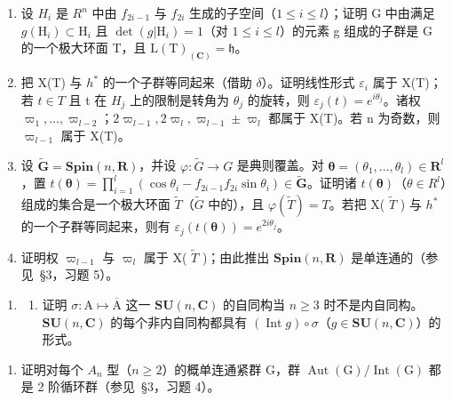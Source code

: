 \begin{enumerate}
\def\labelenumi{\alph{enumi})}
\tightlist
\item
  设 \(H_{i}\) 是 \(R^{n}\) 中由 \(f_{2i-1}\) 与 \(f_{2i}\) 生成的子空间（\(1 \leq i \leq l\)）；证明 G 中由满足 \(g(\mathrm{H}_{i}) \subset \mathrm{H}_{i}\) 且 \(\det(g|\mathrm{H}_{i}) = 1\)（对 \(1 \leq i \leq l\)）的元素 g 组成的子群是 G 的一个极大环面 T，且 \(\mathrm{L}(\mathrm{T})_{(\mathbf{C})} = \mathfrak{h}\)。
\item
  把 X(T) 与 \(h^{*}\) 的一个子群等同起来（借助 \(\delta\)）。证明线性形式 \(\varepsilon_{i}\) 属于 X(T)；若 \(t \in T\) 且 t 在 \(H_{j}\) 上的限制是转角为 \(\theta_{j}\) 的旋转，则 \(\varepsilon_{j}(t) = e^{i\theta_{j}}\)。诸权 \(\varpi_{1}, \ldots, \varpi_{l-2}\)；\(2\varpi_{l-1}, 2\varpi_{l}, \varpi_{l-1} \pm \varpi_{l}\) 都属于 X(T)。若 n 为奇数，则 \(\varpi_{l-1}\) 属于 X(T)。
\item
  设 \(\tilde{\mathbf{G}} = \mathbf{Spin}(n, \mathbf{R})\)，并设 \(\varphi : \tilde{G} \to G\) 是典则覆盖。对 \(\boldsymbol{\theta} = (\theta_{1}, \ldots, \theta_{l}) \in \mathbf{R}^{l}\)，置 \(t(\boldsymbol{\theta}) = \prod_{i=1}^{l} (\cos\theta_{i} - f_{2i-1}f_{2i}\sin\theta_{i}) \in \tilde{\mathbf{G}}\)。证明诸 \(t(\boldsymbol{\theta})\)（\(\theta \in R^{l}\)）组成的集合是一个极大环面 \(\tilde{T}\)（\(\tilde{G}\) 中的），且 \(\varphi(\tilde{T}) = T\)。若把 X( \(\tilde{T}\) ) 与 \(h^{*}\) 的一个子群等同起来，则有 \(\varepsilon_{j}(t(\boldsymbol{\theta})) = e^{2i\theta_{j}}\)。
\item
  证明权 \(\varpi_{l-1}\) 与 \(\varpi_{l}\) 属于 X( \(\tilde{T}\) )；由此推出 \(\mathbf{Spin}(n,\mathbf{R})\) 是单连通的（参见~§3，习题 5）。
\end{enumerate}

\begin{enumerate}
\def\labelenumi{\arabic{enumi})}
\setcounter{enumi}{2}
\tightlist
\item
  \begin{enumerate}
  \def\labelenumii{\alph{enumii})}
  \tightlist
  \item
    证明 \(\sigma: \mathrm{A} \mapsto \overline{\mathrm{A}}\) 这一 \(\mathbf{SU}(n, \mathbf{C})\) 的自同构当 \(n \geq 3\) 时不是内自同构。\(\mathbf{SU}(n, \mathbf{C})\) 的每个非内自同构都具有 \((\operatorname{Int} g) \circ \sigma\)（\(g \in \mathbf{SU}(n, \mathbf{C})\)）的形式。
  \end{enumerate}
\end{enumerate}

\begin{enumerate}
\def\labelenumi{\alph{enumi})}
\setcounter{enumi}{1}
\tightlist
\item
  证明对每个 \(A_{n}\) 型（\(n \geq 2\)）的概单连通紧群 G，群 \(\operatorname{Aut}(\mathrm{G})/\operatorname{Int}(\mathrm{G})\) 都是 2 阶循环群（参见~§3，习题 4）。
\end{enumerate}

